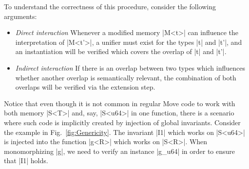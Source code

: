 \noindent To understand the correctness of this procedure, consider the following arguments:

\begin{itemize}
\item \emph{Direct interaction} Whenever a modified memory |M<t>| can influence
  the interpretation of |M<t'>|, a unifier must exist for the types |t| and |t'|,
  and an instantiation will be verified which covers the overlap of |t| and
  |t'|.
\item \emph{Indirect interaction} If there is an overlap between two types
  which influences whether another overlap is semantically relevant, the
  combination of both overlaps will be verified via the extension step.
\end{itemize}

Notice that even though it is not common in regular Move code to work with both
memory |S<T>| and, say, |S<u64>| in one function, there is a scenario where such
code is implicitly created by injection of global invariants. Consider the
example in Fig.~\ref{fig:Genericity}. The invariant |I1| which works on |S<u64>|
is injected into the function |g<R>| which works on |S<R>|. When monomorphizing
|g|, we need to verify an instance |g_u64| in order to ensure that |I1| holds.



